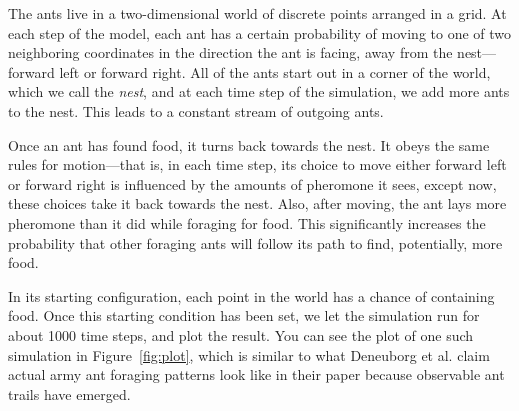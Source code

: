 The ants live in a two-dimensional world of discrete points arranged in a grid. At each step of the model, each ant has a certain probability of moving to one of two neighboring coordinates in the direction the ant is facing, away from the nest---forward left or forward right. All of the ants start out in a corner of the world, which we call the \emph{nest}, and at each time step of the simulation, we add more ants to the nest. This leads to a constant stream of outgoing ants.

\begin{figure}
  \vspace{-20pt}
  \vspace{-20pt}
\end{figure}

Once an ant has found food, it turns back towards the nest. It obeys the same rules for motion---that is, in each time step, its choice to move either forward left or forward right is influenced by the amounts of pheromone it sees, except now, these choices take it back towards the nest. Also, after moving, the ant lays more pheromone than it did while foraging for food. This significantly increases the probability that other foraging ants will follow its path to find, potentially, more food.

In its starting configuration, each point in the world has a chance of containing food. Once this starting condition has been set, we let the simulation run for about 1000 time steps, and plot the result. You can see the plot of one such simulation in Figure~\ref{fig:plot}, which is similar to what Deneuborg et al. claim actual army ant foraging patterns look like in their paper because observable ant trails have emerged.

